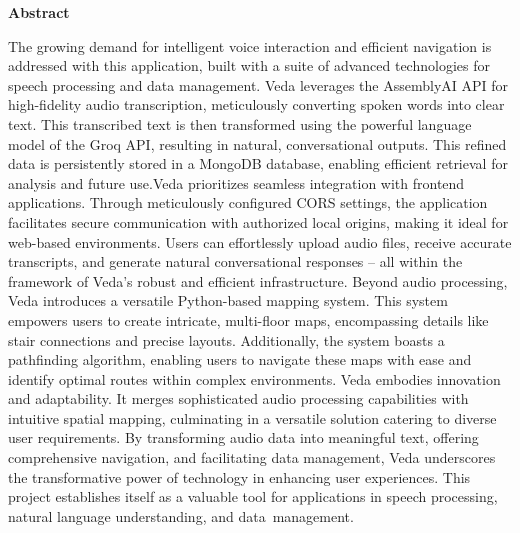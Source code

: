 \documentclass[12pt,a4paper]{report}
\renewcommand{\baselinestretch}{1.25}
\begin{document}
\newpage
\tableofcontents
{}

\newpage
{}
\begin{LARGE}{\textbf{{\Huge \hspace{35pt} \hspace{35pt}  \hspace{35pt}Abstract}}}
\vspace{2.5cm}
{\Large
	
{\large The growing demand for intelligent voice interaction and efficient navigation is addressed with this  application, built  with a suite of advanced technologies for speech processing and data management. Veda leverages the AssemblyAI API for high-fidelity audio transcription, meticulously converting spoken words into clear text. This transcribed text is then transformed using the powerful language model of the Groq API, resulting in natural, conversational outputs. This refined data is persistently stored in a MongoDB database, enabling efficient retrieval for analysis and future use.Veda prioritizes seamless integration with frontend applications. Through meticulously configured CORS settings, the application facilitates secure communication with authorized local origins, making it ideal for web-based environments. Users can effortlessly upload audio files, receive accurate transcripts, and generate natural conversational responses – all within the framework of Veda's robust and efficient infrastructure.
Beyond audio processing, Veda introduces a versatile Python-based mapping system. This system empowers users to create intricate, multi-floor maps, encompassing details like stair connections and precise layouts. Additionally, the system boasts a pathfinding algorithm, enabling users to navigate these maps with ease and identify optimal routes within complex environments. Veda embodies innovation and adaptability. It merges sophisticated audio processing capabilities with intuitive spatial mapping, culminating in a versatile solution catering to diverse user requirements. By transforming audio data into meaningful text, offering comprehensive navigation, and facilitating data management, Veda underscores the transformative power of technology in enhancing user experiences. This project establishes itself as a valuable tool for applications in speech processing, natural language understanding, and data management.
}}
\end{LARGE}

\newpage
{}
\listoffigures
	
\end{document}

